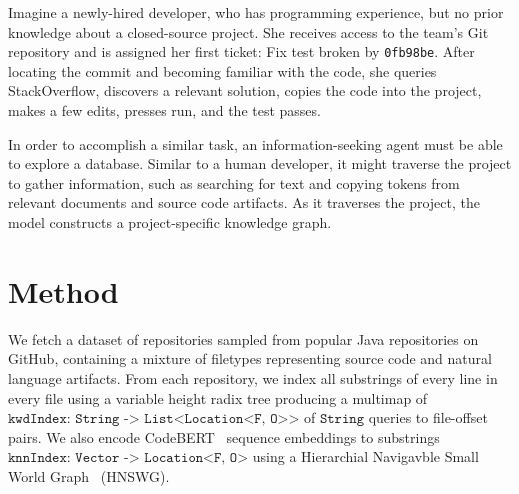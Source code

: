 \documentclass[11pt]{article}
\begin{document}
Imagine a newly-hired developer, who has programming experience, but no prior knowledge about a closed-source project. She receives access to the team's Git repository and is assigned her first ticket: Fix test broken by \texttt{0fb98be}. After locating the commit and becoming familiar with the code, she queries StackOverflow, discovers a relevant solution, copies the code into the project, makes a few edits, presses run, and the test passes.

In order to accomplish a similar task, an information-seeking agent must be able to explore a database. Similar to a human developer, it might traverse the project to gather information, such as searching for text and copying tokens from relevant documents and source code artifacts. As it traverses the project, the model constructs a project-specific knowledge graph.



\section{Method}

We fetch a dataset of repositories sampled from popular Java repositories on GitHub, containing a mixture of filetypes representing source code and natural language artifacts. From each repository, we index all substrings of every line in every file using a variable height radix tree producing a multimap of $\texttt{kwdIndex: String -> List<Location<F, O>>}$ of $\texttt{String}$  queries to file-offset pairs. We also encode CodeBERT~\cite{feng2020codebert} sequence embeddings to substrings $\texttt{knnIndex: Vector -> Location<F, O>}$ using a Hierarchial Navigavble Small World Graph~\cite{malkov2018efficient} (HNSWG).
\end{document}
